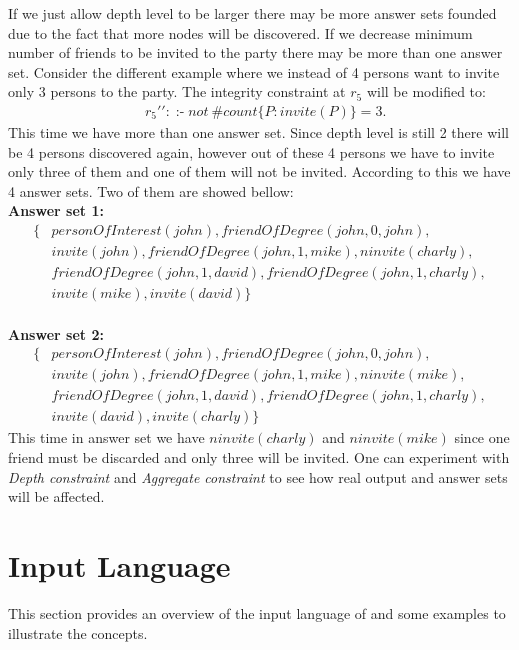 \documentclass[a4paper, titlepage]{article}
\DeclareMathOperator{\leftimpl}{:-}
\begin{document}
If we just allow depth level to be larger there may be more 
answer sets founded due to the fact that more nodes will be 
discovered. If we decrease minimum number of friends to be 
invited to the party there may be more than one answer set. 
Consider the different example where we instead of 4 
persons want to invite only 3 persons to the party. 
The integrity constraint at $r_5$ will be modified to:
\begin{align*}
& r_5 \prime \prime \colon \leftimpl \mathit{ not } \  \mathit{\#count} \{ P : \mathit{invite(P)} \} = 3.
\end{align*} 
 This time we have more than one answer set. Since depth 
 level is still 2 there will be 4 persons discovered again, 
 however out of these 4 persons we have to invite only 
 three of them and one of them will not be invited. 
 According to this we have 4 answer sets. Two of them are 
 showed bellow:\\
\textbf{Answer set 1:}\\
\begin{align*}
   \{ &\mathit{personOfInterest(john), 
      friendOfDegree(john,0,john),}\\
      &\mathit{invite(john), friendOfDegree(john,1,mike), 
      \mathit{ninvite(charly)},}\\
      &\mathit{friendOfDegree(john,1,david), 
      friendOfDegree(john,1,charly),}\\
      &\mathit{invite(mike),invite(david)}  \}
 \end{align*}
\\ \textbf{Answer set 2:}\\
 \begin{align*}
   \{&\mathit{personOfInterest(john), 
   friendOfDegree(john,0,john),} \\
   &\mathit{invite(john), friendOfDegree(john,1,mike), 
   \mathit{ninvite(mike)},}\\
   &\mathit{friendOfDegree(john,1,david), 
   friendOfDegree(john,1,charly),} \\
   &\mathit{invite(david),invite(charly)}\}
 \end{align*}
 This time in answer set we have 
$\mathit{ninvite(charly)}$ and $\mathit{ninvite(mike)}$ 
since one friend must be discarded and only three will be 
invited. One can experiment with \emph{Depth constraint} and 
\emph{Aggregate constraint} to see how real output and 
answer sets will be affected.    


\section{Input Language}%
\label{sec:inputLang}
This section provides an overview of the input language of 
\dlvhex{} and some examples to illustrate the concepts. 
\end{document}
